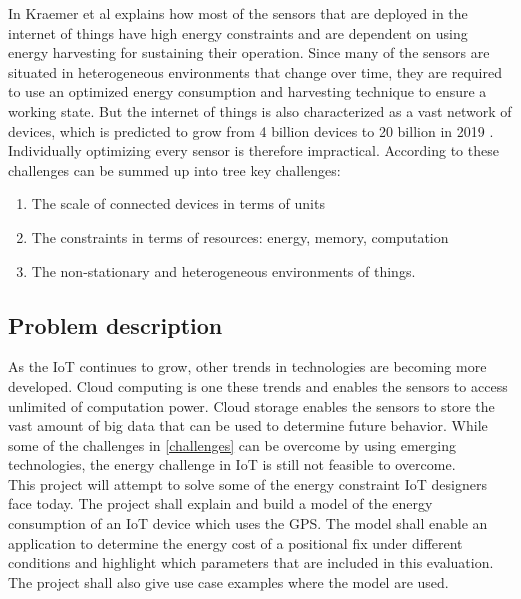 In \cite{kraemer} Kraemer et al explains how most of the sensors that are deployed in the internet of things have high energy constraints and are dependent on using energy harvesting for sustaining their operation. Since many of the sensors are situated in heterogeneous environments that change over time, they are required to use an optimized energy consumption and harvesting technique to ensure a working state. But the internet of things is also characterized as a vast network of devices, which is predicted to grow from 4 billion devices to 20 billion in 2019 \cite{IEA}. Individually optimizing every sensor is therefore impractical. According to \cite{frank} these challenges can be summed up into tree key challenges: 
\begin{enumerate}
    \item The scale of connected devices in terms of units
    \item The constraints in terms of resources: energy, memory, computation
    \item The non-stationary and heterogeneous environments of things.
    \label{challenges}
    
\end{enumerate}

\subsection{Problem description}

As the  IoT continues to grow, other trends in technologies are becoming more developed. Cloud computing is one these trends \cite{Cloud}  and enables the sensors to access unlimited of computation power. Cloud storage enables the sensors to store the vast amount of big data that can be used to determine future behavior. While some of the challenges in \ref{challenges} can be overcome by using emerging technologies, the energy challenge in IoT is still not feasible to overcome. \\This project will attempt to solve some of the energy constraint IoT designers face today. The project shall explain and build a model of the energy consumption of an IoT device which uses the GPS. The model shall enable an application to determine the energy cost of a positional fix under different conditions and highlight which parameters that are included in this evaluation. The project shall also give use case examples where the model are used.\\





